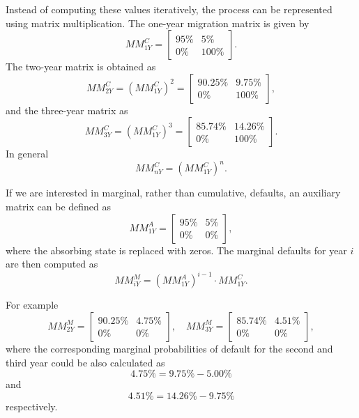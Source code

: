 \documentclass[11pt,a4paper]{article}
\begin{document}
Instead of computing these values iteratively, the process can be represented using matrix multiplication. The one-year migration matrix is given by
\begin{equation}
MM_{1Y}^C = 
\begin{bmatrix}
95\% & 5\% \\
0\%  & 100\%
\end{bmatrix}.
\end{equation}
The two-year matrix is obtained as
\begin{equation}
MM_{2Y}^C = (MM_{1Y}^C)^2 =
\begin{bmatrix}
90.25\% & 9.75\% \\
0\% & 100\%
\end{bmatrix},
\end{equation}
and the three-year matrix as
\begin{equation}
MM_{3Y}^C = (MM_{1Y}^C)^3 =
\begin{bmatrix}
85.74\% & 14.26\% \\
0\% & 100\%
\end{bmatrix}.
\end{equation}
In general
\begin{equation}
MM_{nY}^C = (MM_{1Y}^C)^n.
\end{equation}

If we are interested in marginal, rather than cumulative, defaults, an auxiliary matrix can be defined as
\begin{equation}
MM_{1Y}^A =
\begin{bmatrix}
95\% & 5\% \\
0\% & 0\%
\end{bmatrix},
\end{equation}
where the absorbing state is replaced with zeros. The marginal defaults for year $i$ are then computed as
\begin{equation}
MM_{iY}^M = (MM_{1Y}^A)^{i-1} \cdot MM_{1Y}^C.
\end{equation}

For example
\begin{equation}
MM_{2Y}^M =
\begin{bmatrix}
90.25\% & 4.75\% \\
0\% & 0\%
\end{bmatrix}, \quad
MM_{3Y}^M =
\begin{bmatrix}
85.74\% & 4.51\% \\
0\% & 0\%
\end{bmatrix},
\end{equation}
where the corresponding marginal probabilities of default for the second and third year could be also calculated as
\[
    4.75\% = 9.75\% - 5.00\%
\]
and
\[4.51\% = 14.26\% - 9.75\%
\]
respectively.
\end{document}
